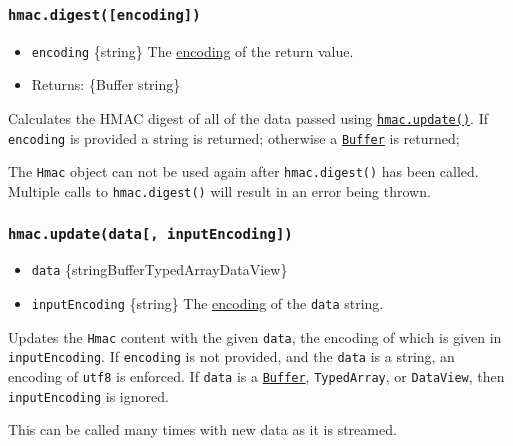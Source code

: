 \subsubsection{\texorpdfstring{\texttt{hmac.digest({[}encoding{]})}}{hmac.digest({[}encoding{]})}}\label{hmac.digestencoding}

\begin{itemize}
\tightlist
\item
  \texttt{encoding} \{string\} The
  \href{buffer.md\#buffers-and-character-encodings}{encoding} of the
  return value.
\item
  Returns: \{Buffer \textbar{} string\}
\end{itemize}

Calculates the HMAC digest of all of the data passed using
\hyperref[hmacupdatedata-inputencoding]{\texttt{hmac.update()}}. If
\texttt{encoding} is provided a string is returned; otherwise a
\href{buffer.md}{\texttt{Buffer}} is returned;

The \texttt{Hmac} object can not be used again after
\texttt{hmac.digest()} has been called. Multiple calls to
\texttt{hmac.digest()} will result in an error being thrown.

\subsubsection{\texorpdfstring{\texttt{hmac.update(data{[},\ inputEncoding{]})}}{hmac.update(data{[}, inputEncoding{]})}}\label{hmac.updatedata-inputencoding}

\begin{itemize}
\tightlist
\item
  \texttt{data}
  \{string\textbar Buffer\textbar TypedArray\textbar DataView\}
\item
  \texttt{inputEncoding} \{string\} The
  \href{buffer.md\#buffers-and-character-encodings}{encoding} of the
  \texttt{data} string.
\end{itemize}

Updates the \texttt{Hmac} content with the given \texttt{data}, the
encoding of which is given in \texttt{inputEncoding}. If
\texttt{encoding} is not provided, and the \texttt{data} is a string, an
encoding of \texttt{\textquotesingle{}utf8\textquotesingle{}} is
enforced. If \texttt{data} is a \href{buffer.md}{\texttt{Buffer}},
\texttt{TypedArray}, or \texttt{DataView}, then \texttt{inputEncoding}
is ignored.

This can be called many times with new data as it is streamed.

